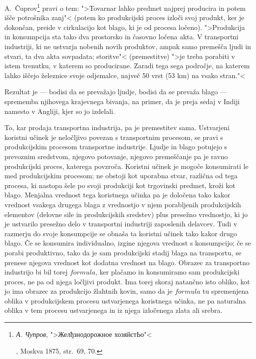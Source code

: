 \documentclass[a5paper]{scrbook}
\begin{document}
A.~Čuprov\footnote{\begin{otherlanguage}{russian}\emph{А. Чупров}, ">Желђзнодорожное хозяйстЬо"<\end{otherlanguage}, Moskva 1875, str.\ 69, 70.} pravi o tem: ">Tovarnar lahko predmet najprej producira in potem išče potrošnika zanj"< (potem ko produkcijski proces izloči svoj produkt, ker je dokončan, preide v cirkulacijo kot blago, ki je od procesa ločeno). ">Produkcija in konsumpcija sta tako dva prostorsko in časovno ločena akta. V transportni industriji, ki ne ustvarja nobenih novih produktov, ampak samo premešča ljudi in stvari, ta dva akta sovpadata; storitve"< (premestitve) ">je treba porabiti v istem trenutku, v katerem so producirane. Zaradi tega sega področje, na katerem lahko iščejo železnice svoje odjemalce, največ 50 vrst (53 km) na vsako stran."<

Rezultat je --- bodisi da se prevažajo ljudje, bodisi da se prevaža blago --- sprememba njihovega krajevnega bivanja, na primer, da je preja sedaj v Indiji namesto v Angliji, kjer so jo izdelali.

To, kar prodaja transportna industrija, pa je premestitev sama. Ustvarjeni koristni učinek je neločljivo povezan s transportnim procesom, se pravi s produkcijskim procesom transportne industrije. Ljudje in blago potujejo s prevoznim sredstvom, njegovo potovanje, njegovo premeščanje pa je ravno produkcijski proces, katerega povzroča. Koristni učinek je mogoče konsumirati le med produkcijskim procesom; ne obstoji kot uporabna stvar, različna od tega procesa, ki nastopa šele po svoji produkciji kot trgovinski predmet, kroži kot blago. Menjalna vrednost tega koristnega učinka pa je določena tako kakor vrednost vsakega drugega blaga z vrednostjo v njem porabljenih produkcijskih elementov (delovne sile in produkcijskih sredstev) plus presežno vrednostjo, ki jo je ustvarilo presežno delo v transportni industriji zaposlenih delavcev. Tudi v razmerju do svoje konsumpcije se obnaša ta koristni učinek tako kakor drugo blago. Če se konsumira individualno, izgine njegova vrednost s konsumpcijo; če se porabi produktivno, tako da je sam produkcijski stadij blaga na transportu, se prenese njegova vrednost kot dodatna vrednost na blago. Obrazec za transportno industrijo bi bil torej \( formula \), ker plačamo in konsumiramo sam produkcijski proces, ne pa od njega ločljivi produkt. Ima torej skoraj natančno isto obliko, kot jo ima obrazec za produkcijo žlahtnih kovin, samo da je \( formula \) tu spremenjena oblika v produkcijskem procesu ustvarjenega koristnega učinka, ne pa naturalna oblika v tem procesu ustvarjenega in iz njega izločenega zlata ali srebra.
\end{document}
